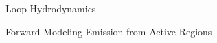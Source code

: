 \documentclass[final]{beamer}
\begin{document}
\begin{frame}
\begin{columns}[T]
\begin{column}{0.49\linewidth}
\begin{block}{Loop Hydrodynamics}
\begin{itemize}
    \end{itemize}
    \end{block}
    \begin{block}{Forward Modeling Emission from Active Regions}
    \begin{columns}[c]
        \begin{column}{0.49\columnwidth}
            \begin{figure}
\end{figure}
\end{column}
\end{columns}
\end{block}
\end{column}
\end{columns}
\end{frame}
\end{document}
